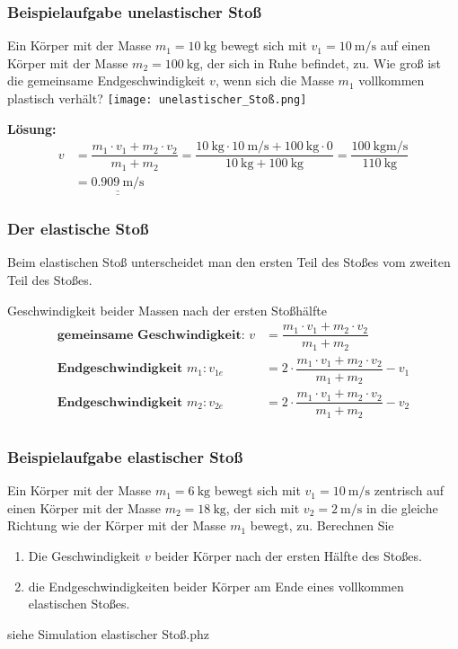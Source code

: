 \documentclass{article}
\newcommand{\Ergebnis}[1]{\underline{\underline{#1}}}
\begin{document}
\frame
{
{
  \frametitle{Beispielaufgabe unelastischer Stoß}
Ein Körper mit der Masse $m_1=\SI{10}{\kilogram}$ bewegt sich mit $v_1=\SI{10}{\meter\per\second}$ auf einen Körper mit der Masse $m_2=\SI{100}{\kilogram}$, der sich in Ruhe befindet, zu. Wie groß ist die gemeinsame Endgeschwindigkeit $v$, wenn sich die Masse $m_1$ vollkommen plastisch verhält?
\texttt{[image: unelastischer\_Stoß.png]}\\
}
{
\textbf{Lösung:}	
	\begin{align*}
	v&=\dfrac{m_1\cdot v_1+m_2\cdot v_2}{m_1+m_2}=\dfrac{\SI{10}{\kilogram}\cdot \SI{10}{\meter\per\second}+\SI{100}{\kilogram}\cdot 0}{\SI{10}{\kilogram}+\SI{100}{\kilogram}}=\dfrac{\SI{100}{\kilogram\meter\per\second}}{\SI{110}{\kilogram}}\\&=\Ergebnis{\SI{0,909}{\meter\per\second}}
	\end{align*}
}
}

\frame
{
  \frametitle{Der elastische Stoß}
  Beim elastischen Stoß unterscheidet man den ersten Teil des Stoßes vom zweiten Teil des Stoßes.
  \begin{block}{Geschwindigkeit beider Massen nach der ersten Stoßhälfte}
	\begin{align*}
	\textbf{gemeinsame Geschwindigkeit: }v&=\dfrac{m_1\cdot v_1+m_2\cdot v_2}{m_1+m_2}\\
	\textbf{Endgeschwindigkeit }m_1:v_{1e}&=2\cdot\dfrac{m_1\cdot v_1+m_2\cdot v_2}{m_1+m_2}-v_1\\
	\textbf{Endgeschwindigkeit }m_2:v_{2e}&=2\cdot\dfrac{m_1\cdot v_1+m_2\cdot v_2}{m_1+m_2}-v_2\\
	\end{align*}
  \end{block}
}

\frame
{
  \frametitle{Beispielaufgabe elastischer Stoß}
Ein Körper mit der Masse $m_1=\SI{6}{\kilogram}$ bewegt sich mit $v_1=\SI{10}{\meter\per\second}$ zentrisch auf einen Körper mit der Masse $m_2=\SI{18}{\kilogram}$, der sich mit $v_2=\SI{2}{\meter\per\second}$ in die gleiche Richtung wie der Körper mit der Masse $m_1$ bewegt, zu. Berechnen Sie
\begin{enumerate}
\item Die Geschwindigkeit $v$ beider Körper nach der ersten Hälfte des Stoßes.
\item die Endgeschwindigkeiten beider Körper am Ende eines vollkommen elastischen Stoßes.
\end{enumerate}
siehe Simulation elastischer Stoß.phz
}
\end{document}
